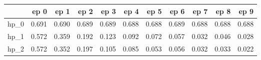 \begin{tabular}{lrrrrrrrrrr}
\toprule
{} &   ep 0 &   ep 1 &   ep 2 &   ep 3 &   ep 4 &   ep 5 &   ep 6 &   ep 7 &   ep 8 &   ep 9 \\
\midrule
hp\_0 &  0.691 &  0.690 &  0.689 &  0.689 &  0.688 &  0.688 &  0.689 &  0.688 &  0.688 &  0.688 \\
hp\_1 &  0.572 &  0.359 &  0.192 &  0.123 &  0.092 &  0.072 &  0.057 &  0.032 &  0.046 &  0.028 \\
hp\_2 &  0.572 &  0.352 &  0.197 &  0.105 &  0.085 &  0.053 &  0.056 &  0.032 &  0.033 &  0.022 \\
\bottomrule
\end{tabular}

